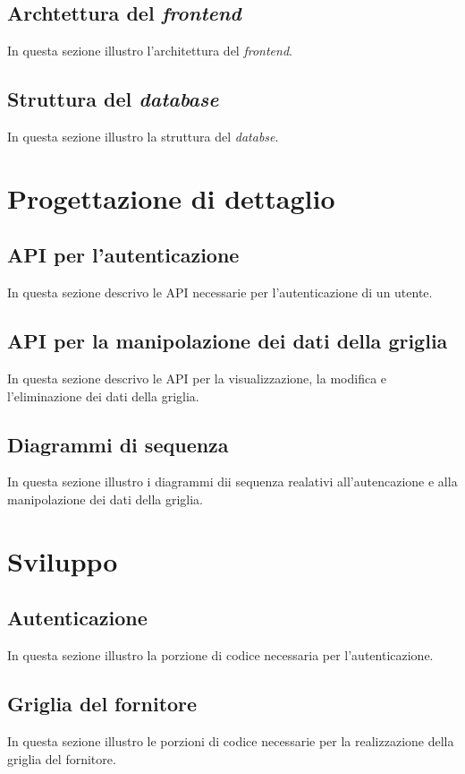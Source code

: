 \subsection{Archtettura del \emph{frontend}}
In questa sezione illustro l'architettura del \emph{frontend}.

\subsection{Struttura del \emph{database}}
In questa sezione illustro la struttura del \emph{databse}.

\section{Progettazione di dettaglio}

\subsection{API per l'autenticazione}
In questa sezione descrivo le API necessarie per l'autenticazione di un utente.

\subsection{API per la manipolazione dei dati della griglia}
In questa sezione descrivo le API per la visualizzazione, la modifica e l'eliminazione dei dati della griglia.

\subsection{Diagrammi di sequenza}
In questa sezione illustro i diagrammi dii sequenza realativi all'autencazione e alla manipolazione dei dati della griglia.

\section{Sviluppo}

\subsection{Autenticazione}
In questa sezione illustro la porzione di codice necessaria per l'autenticazione.

\subsection{Griglia del fornitore}
In questa sezione illustro le porzioni di codice necessarie per la realizzazione della griglia del fornitore.


